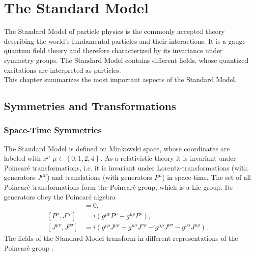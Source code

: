\section{The Standard Model}
The Standard Model of particle physics is the commonly accepted theory describing the world's fundamental particles and their interactions. It is a gauge quantum field theory and therefore characterized by its invariance under symmetry groups. The Standard Model contains different fields, whose quantized excitations are interpreted as particles.\\
This chapter summarizes the most important aspects of the Standard Model.


\subsection{Symmetries and Transformations}
\subsubsection*{Space-Time Symmetries}
The Standard Model is defined on Minkowski space, whose coordinates are labeled with $x^\mu$ $\mu \in \left\{0,1,2,4\right\}$. As a relativistic theory it is invariant under Poincaré transformations, i.e. it is invariant under Lorentz-transformations (with generators $J^{\mu\nu}$) and translations (with generators $P^\mu$) in space-time. The set of all Poincaré transformations form the Poincaré group, which is a Lie group. Its generators obey the Poincaré algebra
\begin{align}
[P^\mu,P^\nu] &= 0,\nonumber\\
[P^\mu,J^{\nu\rho}] &= i(g^{\mu\nu} P^\rho - g^{\mu\rho}P^\nu),\nonumber\\
[J^{\mu\nu},J^{\rho\sigma}] &= i(g^{\nu\rho}J^{\mu\rho} + g^{\mu\sigma}J^{\nu\rho} - g^{\mu\rho}J^{\nu\sigma} - g^{\nu\sigma}J^{\mu\rho}).\label{eq:PoincareAlgebra}
\end{align}
The fields of the Standard Model transform in different representations of the Poincaré group \cite{book:17018}. 


